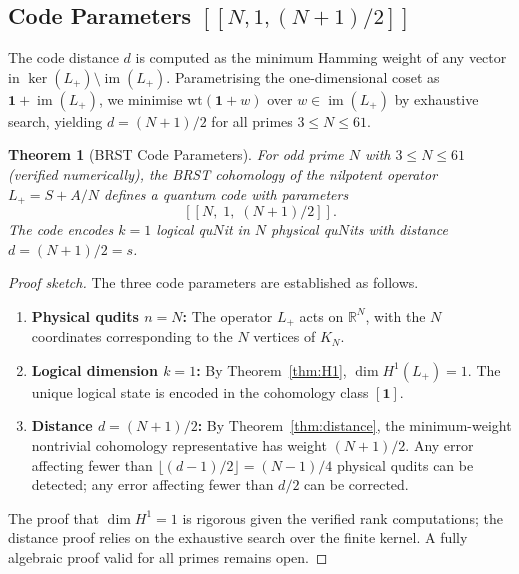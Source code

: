\documentclass[aip,jmp,reprint,superscriptaddress,floatfix,nofootinbib]{revtex4-2}
\newtheorem{theorem}{Theorem}
\theoremstyle{definition}
\theoremstyle{remark}
\begin{document}
\subsection{Code Parameters \texorpdfstring{$[[N, 1, (N{+}1)/2]]$}{[[N, 1, (N+1)/2]]}}
\label{sec:brst:code}

The code distance $d$ is computed as the minimum Hamming weight of
any vector in $\ker(L_+) \setminus \operatorname{im}(L_+)$.
Parametrising the one-dimensional coset as
$\mathbf{1} + \operatorname{im}(L_+)$, we minimise
$\mathrm{wt}(\mathbf{1} + w)$ over $w \in \operatorname{im}(L_+)$
by exhaustive search, yielding $d = (N{+}1)/2$ for all primes
$3 \le N \le 61$.

\begin{theorem}[BRST Code Parameters]\label{thm:code}
For odd prime $N$ with $3 \le N \le 61$ (verified numerically), the
BRST cohomology of the nilpotent operator $L_+ = S + A/N$ defines a
quantum code with parameters
\begin{equation}\label{eq:code-params}
[[N,\; 1,\; (N{+}1)/2]].
\end{equation}
The code encodes $k = 1$ logical qu$N$it in $N$ physical qu$N$its
with distance $d = (N{+}1)/2 = s$.
\end{theorem}

\begin{proof}[Proof sketch]
The three code parameters are established as follows.
\begin{enumerate}[label=(\roman*)]
\item \textbf{Physical qudits $n = N$:} The operator $L_+$ acts on
  $\mathbb{R}^N$, with the $N$ coordinates corresponding to the $N$
  vertices of $K_N$.
\item \textbf{Logical dimension $k = 1$:} By Theorem~\ref{thm:H1},
  $\dim H^1(L_+) = 1$.  The unique logical state is encoded in the
  cohomology class $[\mathbf{1}]$.
\item \textbf{Distance $d = (N{+}1)/2$:} By
  Theorem~\ref{thm:distance}, the minimum-weight nontrivial
  cohomology representative has weight $(N{+}1)/2$.  Any error
  affecting fewer than $\lfloor(d{-}1)/2\rfloor = (N{-}1)/4$
  physical qudits can be detected; any error affecting fewer than
  $d/2$ can be corrected.
\end{enumerate}
The proof that $\dim H^1 = 1$ is rigorous given the verified
rank computations; the distance proof relies on the exhaustive
search over the finite kernel.  A fully algebraic proof valid for
all primes remains open.
\end{proof}
\end{document}

